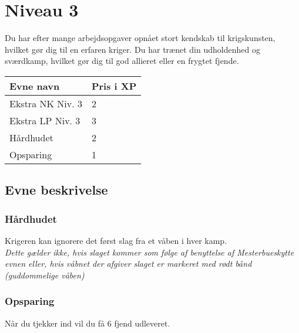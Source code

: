 \chapter{Niveau 3}
Du har efter mange arbejdsopgaver opnået stort kendskab til krigskunsten, hvilket gør dig til en erfaren kriger. Du har trænet din udholdenhed og sværdkamp, hvilket gør dig til god allieret eller en frygtet fjende.
\begin{table}[H]
    \centering
    \begin{tabular}{|p{}|p{}|}
    \rowcolor{cerulean!80}\hline
        Evne navn & Pris i XP \\\hline
         Ekstra NK Niv. 3 & 2 \\\hline
         Ekstra LP Niv. 3 & 3 \\\hline
         Hårdhudet & 2\\\hline
         Opsparing & 1\\
         \hline
    \end{tabular}
\end{table}
\section{Evne beskrivelse}





\subsection{Hårdhudet}
Krigeren kan ignorere det først slag fra et våben i hver kamp.\\
\emph{Dette gælder ikke, hvis slaget kommer som følge af benyttelse af Mesterbueskytte evnen eller, hvis våbnet der afgiver slaget er markeret med rødt bånd (guddommelige våben)}\\

\subsection{Opsparing}
Når du tjekker ind vil du få 6 fjend udleveret.